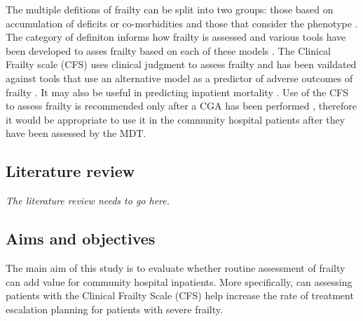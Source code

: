 \documentclass[12pt,a4paper,oneside,titlepage]{article}
\begin{document}
The multiple defitions of frailty can be split into two groups: those based on accumulation 
of deficits or co-morbidities and those that consider the phenotype \parencite{shamliyan:13}. 
The category of definiton informs how frailty is assessed and various tools have been developed
to asses frailty based on each of these models \parencite{clegg:13}.
The Clinical Frailty scale (CFS) \parencite{dalhousie:15} uses clinical judgment 
to assess frailty and has been vaildated
against tools that use an alternative model as a predictor of adverse outcomes 
of frailty \parencite{rockwood:05}. It may also be useful in predicting
inpatient mortality \parencite{wallis:15}.
Use of the CFS to
assess frailty is recommended only after a CGA has been performed \parencite{bgs:14}, therefore
it would be appropriate to use it in the community hospital patients after they
have been assessed by the MDT.

\subsection*{Literature review}
\emph{The literature review needs to go here.}

\subsection*{Aims and objectives}
The main aim of this study is to evaluate whether routine assessment of
frailty can add value for community hospital inpatients.
More specifically, can assessing patients with the Clinical Frailty Scale (CFS)
help increase the rate of 
treatment escalation planning for patients with severe frailty. 
\end{document}
